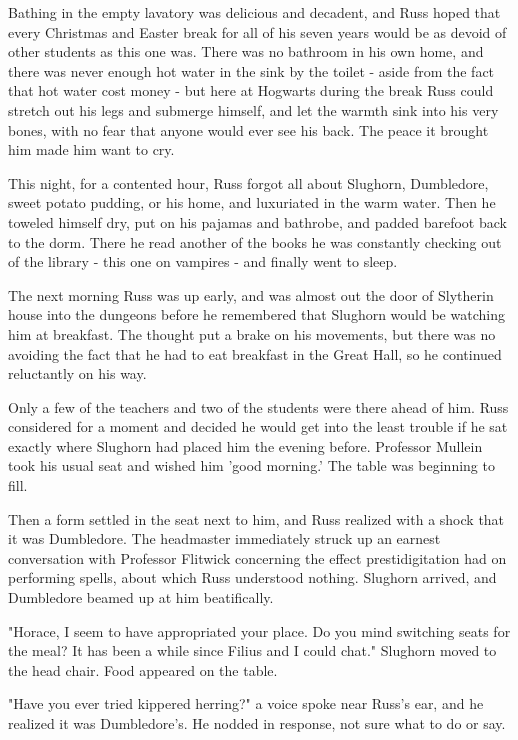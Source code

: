 \documentclass[a4paper,11pt]{article}
\begin{document}
Bathing in the empty lavatory was delicious and decadent, and Russ hoped that every Christmas and Easter break for all of his seven years would be as devoid of other students as this one was. There was no bathroom in his own home, and there was never enough hot water in the sink by the toilet - aside from the fact that hot water cost money - but here at Hogwarts during the break Russ could stretch out his legs and submerge himself, and let the warmth sink into his very bones, with no fear that anyone would ever see his back. The peace it brought him made him want to cry.

This night, for a contented hour, Russ forgot all about Slughorn, Dumbledore, sweet potato pudding, or his home, and luxuriated in the warm water. Then he toweled himself dry, put on his pajamas and bathrobe, and padded barefoot back to the dorm. There he read another of the books he was constantly checking out of the library - this one on vampires - and finally went to sleep.

The next morning Russ was up early, and was almost out the door of Slytherin house into the dungeons before he remembered that Slughorn would be watching him at breakfast. The thought put a brake on his movements, but there was no avoiding the fact that he had to eat breakfast in the Great Hall, so he continued reluctantly on his way.

Only a few of the teachers and two of the students were there ahead of him. Russ considered for a moment and decided he would get into the least trouble if he sat exactly where Slughorn had placed him the evening before. Professor Mullein took his usual seat and wished him 'good morning.' The table was beginning to fill.

Then a form settled in the seat next to him, and Russ realized with a shock that it was Dumbledore. The headmaster immediately struck up an earnest conversation with Professor Flitwick concerning the effect prestidigitation had on performing spells, about which Russ understood nothing. Slughorn arrived, and Dumbledore beamed up at him beatifically.

"Horace, I seem to have appropriated your place. Do you mind switching seats for the meal? It has been a while since Filius and I could chat." Slughorn moved to the head chair. Food appeared on the table.

"Have you ever tried kippered herring?" a voice spoke near Russ's ear, and he realized it was Dumbledore's. He nodded in response, not sure what to do or say.
\end{document}
